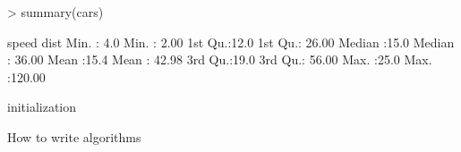 \documentclass{article}
\begin{document}


\begin{Schunk}
\begin{Sinput}
> summary(cars)
\end{Sinput}
\begin{Soutput}
     speed           dist       
 Min.   : 4.0   Min.   :  2.00  
 1st Qu.:12.0   1st Qu.: 26.00  
 Median :15.0   Median : 36.00  
 Mean   :15.4   Mean   : 42.98  
 3rd Qu.:19.0   3rd Qu.: 56.00  
 Max.   :25.0   Max.   :120.00  
\end{Soutput}
\end{Schunk}

\begin{algorithm}[H]
 initialization\;
 \caption{How to write algorithms}
\end{algorithm}
\end{document}
